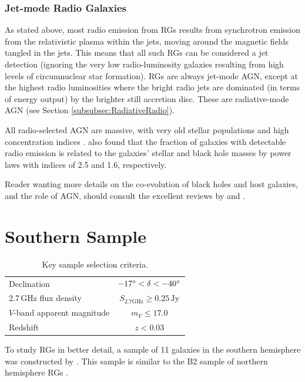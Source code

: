 		\subsubsection{Jet-mode Radio Galaxies}
			\label{subsubsec:JetRadio}
			As stated above, most radio emission from RGs results from synchrotron emission from the relativistic plasma within the jets, moving around the magnetic fields tangled in the jets. This means that all such RGs can be considered a jet detection (ignoring the very low radio-luminosity galaxies resulting from high levels of circumnuclear star formation). RGs are always jet-mode AGN, except at the highest radio luminosities where the bright radio jets are dominated (in terms of energy output) by the brighter still accretion disc. These are radiative-mode AGN (see Section \ref{subsubsec:RadiativeRadio}).

			All radio-selected AGN are massive, with very old stellar populations and high concentration indices \citep[e.g.][]{Best2005}. \citet{Best2005} also found that the fraction of galaxies with detectable radio emission is related to the galaxies' stellar and black hole masses by power laws with indices of 2.5 and 1.6, respectively.

	Reader wanting more details on the co-evolution of black holes and host galaxies, and the role of AGN, should consult the excellent reviews by \citet{Fabian2012} and \citet{Heckman2014}. 

\section{Southern Sample}
	\label{sec:Sample}

	\begin{table}
		\centering
		\caption{Key sample selection criteria.}
		\label{tab:selection}
		\begin{tabular}{l c}
			\hline
			\hline
			Declination				& $-17\degree < \delta < -40\degree$ \\
			2.7\,GHz flux density 		& $S_\text{2.7GHz} \ge 0.25 \, \text{Jy} $ \\
			$V$-band apparent magnitude 	& $m_V \le 17.0 $ \\
			Redshift 					& $z < 0.03$ \\			
			\hline
			\hline
		\end{tabular}
	\end{table}

	To study RGs in better detail, a sample of 11 galaxies in the southern hemisphere was constructed by \citet{Prandoni2010}. This sample is similar to the B2 sample of northern hemisphere RGs \citep{Prandoni2007}.

